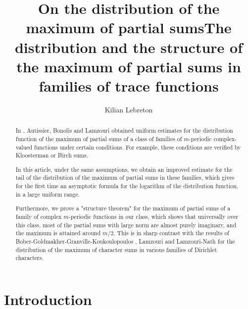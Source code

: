 \documentclass[12pt]{amsart}
\title{On the distribution of the maximum of partial sums}
\title[The maximum of partial sums in families of trace functions]{The distribution and the structure of the maximum of partial sums in families of trace functions}
\author{Kilian Lebreton}
\theoremstyle{definition}
\numberwithin{equation}{section}
\numberwithin{equation}{section}
\begin{document}
\baselineskip=17pt










\begin{abstract} 
In \cite{ABL21}, Autissier, Bonolis and Lamzouri obtained uniform estimates for the distribution function of the maximum of partial sums of a class of families of $m$-periodic complex-valued functions under certain conditions. For example, these conditions are verified by Kloosterman or Birch sums.


In this article, under the same assumptions, we obtain an improved estimate for the tail of the distribution of the maximum of partial sums in these families, which gives for the first time an asymptotic formula for the logarithm of the distribution function, in a large uniform range. 

Furthermore, we prove a "structure theorem" for the maximum of partial sums of a family of complex $m$-periodic functions in our class, which shows that universally over this class, most of the partial sums with large norm are almost purely imaginary, and the maximum is attained around $m/2$. This is in sharp contrast with the results of Bober-Goldmakher-Granville-Koukoulopoulos \cite{BGGK18}, Lamzouri \cite{Lam24} and Lamzouri-Nath \cite{LN24} for the distribution of the maximum of character sums in various families of Dirichlet characters.
\end{abstract}




\maketitle



\section{Introduction}
\end{document}
